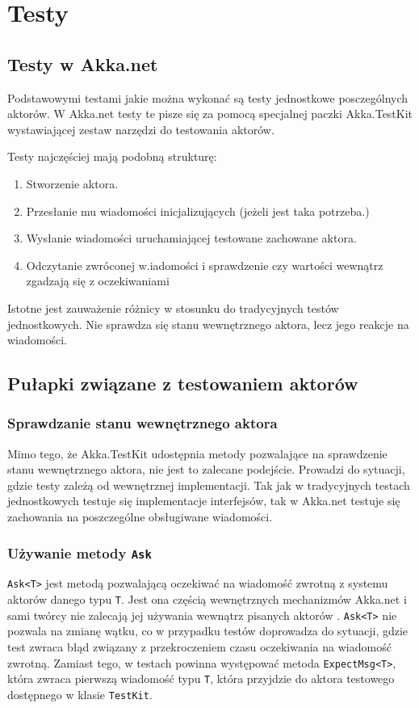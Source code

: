 \chapter{Testy}
\section{Testy w Akka.net}
Podstawowymi testami jakie można wykonać są testy jednostkowe posczególnych aktorów.
W Akka.net testy te pisze się za pomocą specjalnej paczki Akka.TestKit wystawiającej zestaw narzędzi do testowania aktorów.

Testy najczęściej mają podobną strukturę:
\begin{enumerate}
    \item Stworzenie aktora.
    \item Przesłanie mu wiadomości inicjalizujących (jeżeli jest taka potrzeba.)
    \item Wysłanie wiadomości uruchamiającej testowane zachowane aktora.
    \item Odczytanie zwróconej w.iadomości i sprawdzenie czy wartości wewnątrz zgadzają się z oczekiwaniami
\end{enumerate}
Istotne jest zauważenie różnicy w stosunku do tradycyjnych testów jednostkowych. Nie sprawdza się stanu wewnętrznego aktora, lecz jego reakcje na wiadomości.

\section{Pułapki związane z testowaniem aktorów}
\subsection{Sprawdzanie stanu wewnętrznego aktora}
Mimo tego, że Akka.TestKit udostępnia metody pozwalające na sprawdzenie stanu wewnętrznego aktora, nie jest to zalecane podejście. 
Prowadzi do sytuacji, gdzie testy zależą od wewnętrznej implementacji. 
Tak jak w tradycyjnych testach jednostkowych testuje się implementacje interfejsów, tak w Akka.net testuje się zachowania na poszczególne obsługiwane wiadomości.

\subsection{Używanie metody \lstinline{Ask} }
\lstinline{Ask<T>} jest metodą pozwalającą oczekiwać na wiadomość zwrotną z systemu aktorów danego typu \lstinline{T}.
Jest ona częścią wewnętrznych mechanizmów Akka.net i sami twórcy nie zalecają jej używania wewnątrz pisanych aktorów \cite{bib:AkkaNoAsk}. 
\lstinline{Ask<T>} nie pozwala na zmianę wątku, co w przypadku testów doprowadza do sytuacji, gdzie test zwraca błąd związany z przekroczeniem czasu oczekiwania na wiadomość zwrotną. Zamiast tego, w testach powinna występować metoda \lstinline{ExpectMsg<T>}, która zwraca pierwszą wiadomość typu \lstinline{T}, która przyjdzie do aktora testowego dostępnego w klasie \lstinline{TestKit}.  

